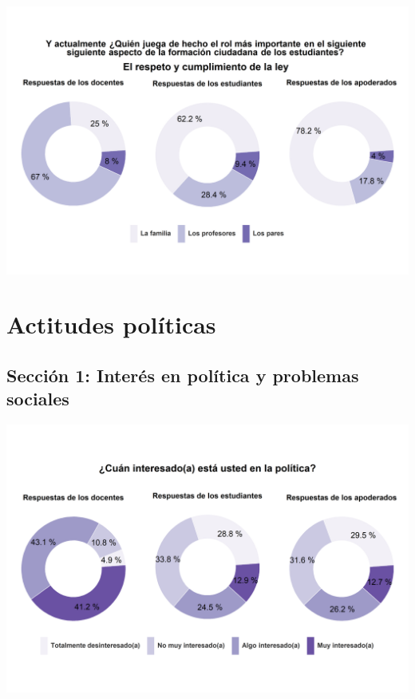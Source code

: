 \documentclass[
  14pt,
]{book}
\begin{document}
\begin{center}\includegraphics[width=52.49in]{images/graph_for_ciud11} \end{center}

\hypertarget{actitudes-poluxedticas}{%
\chapter{Actitudes políticas}\label{actitudes-poluxedticas}}

\hypertarget{secciuxf3n-1-interuxe9s-en-poluxedtica-y-problemas-sociales}{%
\section{Sección 1: Interés en política y problemas sociales}\label{secciuxf3n-1-interuxe9s-en-poluxedtica-y-problemas-sociales}}

\begin{center}\includegraphics[width=52.49in]{images/graph_intpol} \end{center}
\end{document}
